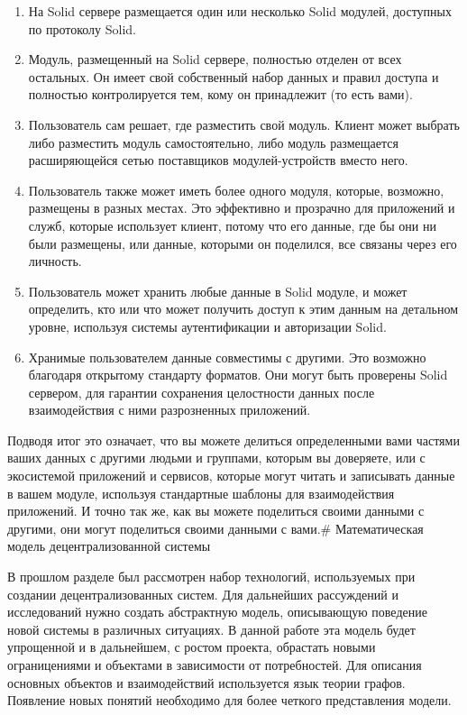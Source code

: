 \begin{enumerate}
\def\labelenumi{\arabic{enumi}.}
\tightlist
\item
  На Solid сервере размещается один или несколько Solid модулей,
  доступных по протоколу Solid.
\item
  Модуль, размещенный на Solid сервере, полностью отделен от всех
  остальных. Он имеет свой собственный набор данных и правил доступа и
  полностью контролируется тем, кому он принадлежит (то есть вами).
\item
  Пользователь сам решает, где разместить свой модуль. Клиент может
  выбрать либо разместить модуль самостоятельно, либо модуль размещается
  расширяющейся сетью поставщиков модулей-устройств вместо него.
\item
  Пользователь также может иметь более одного модуля, которые, возможно,
  размещены в разных местах. Это эффективно и прозрачно для приложений и
  служб, которые использует клиент, потому что его данные, где бы они ни
  были размещены, или данные, которыми он поделился, все связаны через
  его личность.
\item
  Пользователь может хранить любые данные в Solid модуле, и может
  определить, кто или что может получить доступ к этим данным на
  детальном уровне, используя системы аутентификации и авторизации
  Solid.
\item
  Хранимые пользователем данные совместимы с другими. Это возможно
  благодаря открытому стандарту форматов. Они могут быть проверены Solid
  сервером, для гарантии сохранения целостности данных после
  взаимодействия с ними разрозненных приложений.
\end{enumerate}

Подводя итог это означает, что вы можете делиться определенными вами
частями ваших данных с другими людьми и группами, которым вы доверяете,
или с экосистемой приложений и сервисов, которые могут читать и
записывать данные в вашем модуле, используя стандартные шаблоны для
взаимодействия приложений. И точно так же, как вы можете поделиться
своими данными с другими, они могут поделиться своими данными с вами.\#
Математическая модель децентрализованной системы

В прошлом разделе был рассмотрен набор технологий, используемых при
создании децентрализованных систем. Для дальнейших рассуждений и
исследований нужно создать абстрактную модель, описывающую поведение
новой системы в различных ситуациях. В данной работе эта модель будет
упрощенной и в дальнейшем, с ростом проекта, обрастать новыми
ограницениями и объектами в зависимости от потребностей. Для описания
основных объектов и взаимодействий используется язык теории графов.
Появление новых понятий необходимо для более четкого представления
модели.

